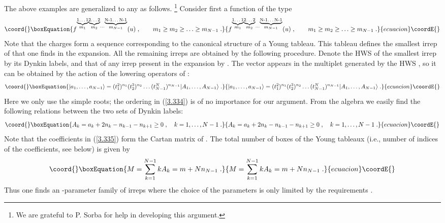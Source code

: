 \documentclass[a4paper,12pt]{article}
\begin{document}
The above \coordHE{} examples are generalized to any \coordHE{} as follows. 
\footnote{We are grateful to P. Sorba for help in developing this 
argument.} Consider first a function of the type 
\begin{equation}\coord{}\boxEquation{\label{3.333}
  f^{\stackrel{\underbrace{\mbox{\scriptsize 
1\ldots 1}}}{m_1} \stackrel{\underbrace{\mbox{\scriptsize 2\ldots 
2}}}{m_2}\cdots \stackrel{\underbrace{\mbox{\scriptsize N-1\ldots 
N-1}}}{m_{N-1}}}(u)\;, \qquad { m_1 \geq m_2\geq \ldots \geq 
m_{N-1} } \;. 
}{f^{\stackrel{\underbrace{\mbox{\scriptsize 
1\ldots 1}}}{m_1} \stackrel{\underbrace{\mbox{\scriptsize 2\ldots 
2}}}{m_2}\cdots \stackrel{\underbrace{\mbox{\scriptsize N-1\ldots 
N-1}}}{m_{N-1}}}(u)\;, \qquad { m_1 \geq m_2\geq \ldots \geq 
m_{N-1} } \;. 
}{ecuacion}\coordE{}\end{equation}
Note that the charges form a sequence corresponding to the 
canonical structure of a Young tableau. This tableau defines the 
smallest irrep of \coordHE{} that one finds in the 
expansion. All the remaining irreps are obtained by the following 
procedure. Denote the HWS of the smallest irrep by its Dynkin 
labels, \coordHE{} and that of any irrep present 
in the expansion by \coordHE{}. The vector 
\coordHE{} appears in the multiplet generated by 
the HWS \coordHE{}, so it can be obtained by the 
action of the lowering operators of \coordHE{}: 
\begin{equation}\coord{}\boxEquation{\label{3.334}
  |a_1,\ldots,a_{N-1}\rangle = (t^2_1)^{n_1}(t^3_2)^{n_2}\ldots 
(t^N_{N-1})^{n_{N-1}}|A_1,\ldots,A_{N-1}\rangle \;.
}{|a_1,\ldots,a_{N-1}\rangle = (t^2_1)^{n_1}(t^3_2)^{n_2}\ldots 
(t^N_{N-1})^{n_{N-1}}|A_1,\ldots,A_{N-1}\rangle \;.
}{ecuacion}\coordE{}\end{equation}
Here we only use the simple roots; the ordering in (\ref{3.334}) 
is of no importance for our argument. From the \coordHE{} 
algebra we easily find the following relations between the two 
sets of Dynkin labels:
\begin{equation}\coord{}\boxEquation{\label{3.335}
  A_k = a_k + 2n_k - n_{k-1} - n_{k+1} \geq 0\;, \quad k=1,\ldots, 
N-1\;.
}{A_k = a_k + 2n_k - n_{k-1} - n_{k+1} \geq 0\;, \quad k=1,\ldots, 
N-1\;.
}{ecuacion}\coordE{}\end{equation}
Note that the coefficients in (\ref{3.335}) form the Cartan matrix 
of \coordHE{}. The total number of boxes of the Young tableaux 
(i.e., number of indices of the coefficients, see below) is given 
by 
\begin{equation}\coord{}\boxEquation{\label{3.335'}
  M = \sum^{N-1}_{k=1}kA_k = m + N n_{N-1}\;.
}{M = \sum^{N-1}_{k=1}kA_k = m + N n_{N-1}\;.
}{ecuacion}\coordE{}\end{equation}
Thus one finds an \coordHE{}-parameter family of irreps where the 
choice of the parameters \coordHE{} is only limited by the requirements 
\coordHE{}.  
\end{document}
